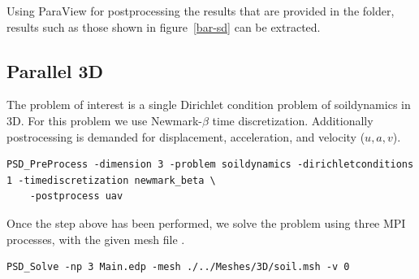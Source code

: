 {{Using ParaView for postprocessing the results that are provided in the  folder, results such as those shown in figure~\ref{bar-sd} can be extracted.


\subsection{Parallel 3D}

The problem of interest is a single Dirichlet condition problem of soildynamics in 3D. For this problem we use Newmark-$\beta$ time discretization. Additionally postrocessing is demanded for displacement, acceleration, and velocity ($u,a,v$).

\begin{lstlisting}[style=BashInputStyle]
	PSD_PreProcess -dimension 3 -problem soildynamics -dirichletconditions 1 -timediscretization newmark_beta \
	-postprocess uav
\end{lstlisting}

Once the step above has been performed, we solve the problem using three MPI processes, with the given mesh file . 

\begin{lstlisting}[style=BashInputStyle]
	PSD_Solve -np 3 Main.edp -mesh ./../Meshes/3D/soil.msh -v 0
\end{lstlisting}

}}
